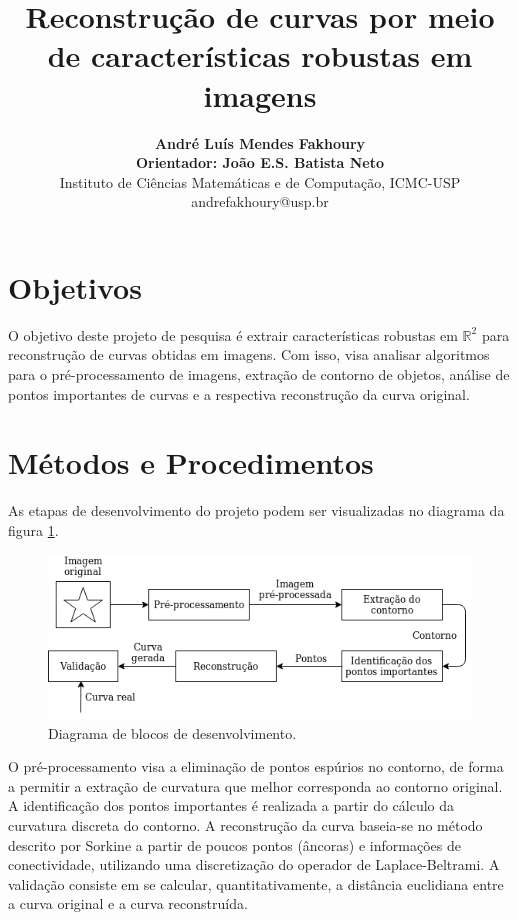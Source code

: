 \documentclass[a4paper,10pt,twocolumn]{article}
\begin{document}
	\title{\large{\vspace{-1cm}\textbf{Reconstrução de curvas por meio de características robustas em imagens}}}
	\author{\textbf{André Luís Mendes Fakhoury}\vspace{0.2cm}\\
		\textbf{Orientador: João E.S. Batista Neto}\vspace{0.2cm}\\
		Instituto de Ciências Matemáticas e de Computação, ICMC-USP\vspace{0.1cm}\\
		\normalsize{andrefakhoury@usp.br \quad }
		}
	
	\date{\null}
	\maketitle
	
	\thispagestyle{fancy}
	
	\section*{\hfil Objetivos}
	
	O objetivo deste projeto de pesquisa é extrair características robustas em $\mathbb{R}^2$ para reconstrução de curvas obtidas em imagens. Com isso, visa analisar algoritmos para o pré-processamento de imagens, extração de contorno de objetos, análise de pontos importantes de curvas e a respectiva reconstrução da curva original.
	
	\section*{\hfil Métodos e Procedimentos}
	As etapas de desenvolvimento do projeto podem ser visualizadas no diagrama da figura \ref{fig:diagrama}.
	\begin{figure}[ht!]
	\centering
	\includegraphics[width=0.84\linewidth]{imagens/diagrama.png}
	\caption{Diagrama de blocos de desenvolvimento.}
	\label{fig:diagrama}
	\end{figure}
	O pré-processamento visa a eliminação de pontos espúrios no contorno, de forma a permitir a extração de curvatura que melhor corresponda ao contorno original. A identificação dos pontos importantes é realizada a partir do cálculo da curvatura discreta do contorno. A reconstrução da curva baseia-se no método descrito por Sorkine \cite{sorkine} a partir de poucos pontos (âncoras) e informações de conectividade, utilizando uma discretização do operador de Laplace-Beltrami. A validação consiste em se calcular, quantitativamente, a distância euclidiana entre a curva original e a curva reconstruída.
	
\end{document}
